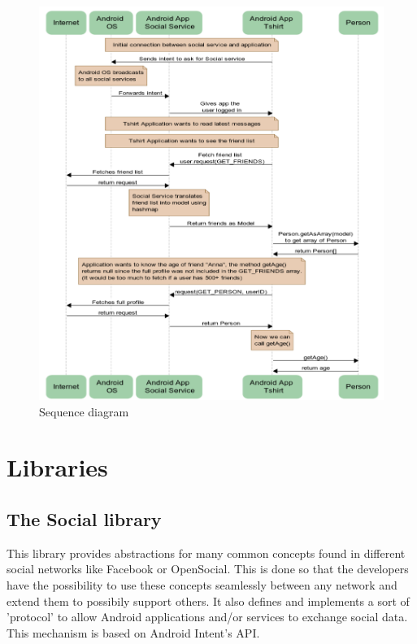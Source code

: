 \begin{figure}[h!]
	\centering \includegraphics[width=1.0\textwidth]{img/design-sequence.png}
	\caption{Sequence diagram}
	\label{fig:design-sequence}
\end{figure}



\section{Libraries}

\subsection{The Social library}
This library provides abstractions for many common concepts found in different
social networks like Facebook or OpenSocial. This is done so that the developers have the possibility
to use these concepts seamlessly between any network and extend them to possibily support others.
It also defines and implements a sort of 'protocol' to allow Android applications and/or services
to exchange social data. This mechanism is based on Android Intent's API.


